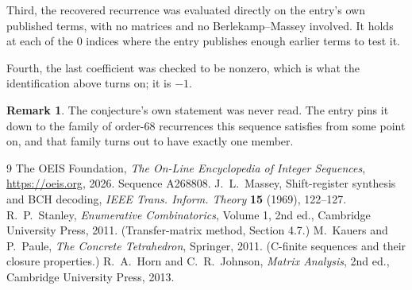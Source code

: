 \documentclass[11pt,a4paper]{article}
\theoremstyle{plain}
\theoremstyle{definition}
\newtheorem{remark}[theorem]{Remark}
\begin{document}
Third, the recovered recurrence was evaluated directly on the entry's own published terms, with
no matrices and no Berlekamp--Massey involved. It holds at each of the $0$ indices where
the entry publishes enough earlier terms to test it.

Fourth, the last coefficient was checked to be nonzero, which is what the identification above
turns on; it is $-1$.

\begin{remark}
The conjecture's own statement was never read. The entry pins it down to the family of
order-$68$ recurrences this sequence satisfies from some point on, and that family turns
out to have exactly one member.
\end{remark}

\begin{thebibliography}{9}
 The OEIS Foundation, \emph{The On-Line Encyclopedia of Integer
Sequences}, \url{https://oeis.org}, 2026. Sequence A268808.
 J.~L.~Massey, Shift-register synthesis and BCH decoding, \emph{IEEE
Trans. Inform. Theory} \textbf{15} (1969), 122--127.
 R.~P.~Stanley, \emph{Enumerative Combinatorics}, Volume 1, 2nd ed.,
Cambridge University Press, 2011. (Transfer-matrix method, Section 4.7.)
 M.~Kauers and P.~Paule, \emph{The Concrete Tetrahedron}, Springer, 2011.
(C-finite sequences and their closure properties.)
 R.~A.~Horn and C.~R.~Johnson, \emph{Matrix Analysis}, 2nd ed., Cambridge
University Press, 2013.
\end{thebibliography}
\end{document}
